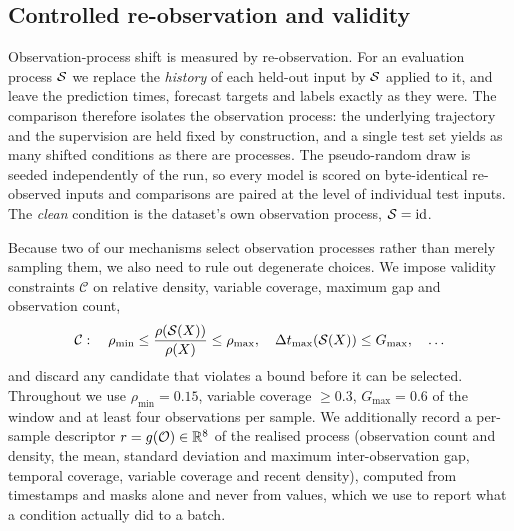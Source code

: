 \subsection{Controlled re-observation and validity}
\label{sec:reobs}
Observation-process shift is measured by re-observation. For an evaluation process $\mathcal{S}$ we replace the
\emph{history} of each held-out input by $\mathcal{S}$ applied to it, and leave the prediction times, forecast targets
and labels exactly as they were. The comparison therefore isolates the observation process: the underlying
trajectory and the supervision are held fixed by construction, and a single test set yields as many shifted
conditions as there are processes. The pseudo-random draw is seeded independently of the run, so every model is
scored on byte-identical re-observed inputs and comparisons are paired at the level of individual test inputs.
The \emph{clean} condition is the dataset's own observation process, $\mathcal{S}=\mathrm{id}$.

Because two of our mechanisms select observation processes rather than merely sampling them, we also need to rule
out degenerate choices. We impose validity constraints $\mathcal{C}$ on relative density, variable coverage,
maximum gap and observation count,
\begin{equation}
\mathcal{C}:\quad \rho_{\min}\le\frac{\rho(\Sobs(X))}{\rho(X)}\le\rho_{\max},\quad
\Delta t_{\max}(\Sobs(X))\le G_{\max},\quad \dots
\label{eq:constraints}
\end{equation}
and discard any candidate that violates a bound before it can be selected. Throughout we use
$\rho_{\min}=0.15$, variable coverage $\ge0.3$, $G_{\max}=0.6$ of the window and at least four observations per
sample. We additionally record a per-sample descriptor $r=g(\mathcal{O})\in\mathbb{R}^{8}$ of the realised process
(observation count and density, the mean, standard deviation and maximum inter-observation gap, temporal
coverage, variable coverage and recent density), computed from timestamps and masks alone and never from values,
which we use to report what a condition actually did to a batch.
